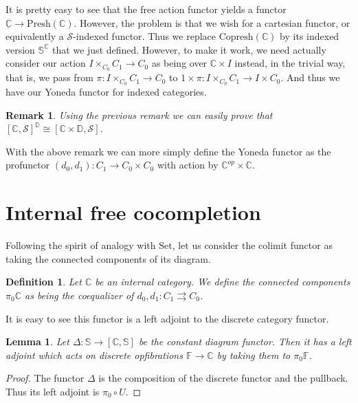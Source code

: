 \documentclass[10pt, oneside]{article}
\newtheorem{definition}[theorem]{Definition}
\newtheorem{remark}[theorem]{Remark}
\newtheorem{lemma}[theorem]{Lemma}
\begin{document}
It is pretty easy to see that the free action functor yields a functor $\underline{\mathbb{C}} \to \mathrm{Presh}{(\mathbb{C})}$. However, the problem is that we wish for a cartesian functor, or equivalently a $\mathcal{S}$-indexed functor. Thus we replace $\mathrm{Copresh}{(\mathbb{C})}$ by its indexed version $\mathbb{S}^\mathbb{C}$ that we just defined. However, to make it work, we need actually consider our action $I \times_{C_0} C_1 \to C_0$ as being over $\mathbb{C} \times I$ instead, in the trivial way, that is, we pass from $\pi: I \times_{C_0} C_1 \to C_0$ to $1 \times \pi: I \times_{C_0} C_1 \to I \times C_0$. And thus we have our Yoneda functor for indexed categories.

\begin{remark}
    Using the previous remark we can easily prove that $[\mathbb{C}, \mathcal{S}]^\mathbb{D} \cong [\mathbb{C} \times \mathbb{D}, \mathcal{S}]$.
\end{remark}

With the above remark we can more simply define the Yoneda functor as the profunctor $(d_0, d_1): C_1 \to C_0 \times C_0$ with action by $\mathbb{C}^{op} \times \mathbb{C}$.

\section{Internal free cocompletion}

Following the spirit of analogy with $\mathrm{Set}$, let us consider the colimit functor as taking the connected components of its diagram.

\begin{definition}
    Let $\mathbb{C}$ be an internal category. We define the connected components $\pi_0 \mathbb{C}$ as being the coequalizer of $d_0, d_1: C_1 \rightrightarrows C_0$.
\end{definition}

It is easy to see this functor is a left adjoint to the discrete category functor.

\begin{lemma}
    Let $\Delta: \mathbb{S} \to [\mathbb{C}, \mathbb{S}]$ be the constant diagram functor. Then it has a left adjoint which acts on discrete opfibrations $\mathbb{F} \to \mathbb{C}$ by taking them to $\pi_0 \mathbb{F}$.
\end{lemma}
\begin{proof}
    The functor $\Delta$ is the composition of the discrete functor and the pullback. Thus its left adjoint is $\pi_0 \circ U$.
\end{proof}
\end{document}
